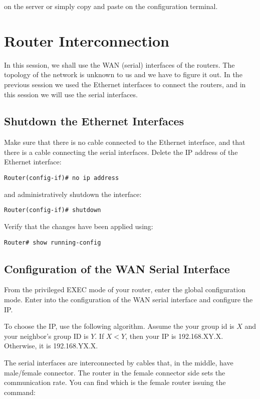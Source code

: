 on the server or simply copy and paste on the configuration terminal.

\section{Router Interconnection}

In this session, we shall use the WAN (serial) interfaces of the routers. The topology of the network is unknown to us and we have to figure it out. In the previous session we used the Ethernet interfaces to connect the routers, and in this session we will use the serial interfaces.

\subsection{Shutdown the Ethernet Interfaces}

Make sure that there is no cable connected to the Ethernet interface, and that there is a cable connecting the serial interfaces. Delete the IP address of the Ethernet interface:

\begin{lstlisting}
Router(config-if)# no ip address
\end{lstlisting}

and administratively shutdown the interface:

\begin{lstlisting}
Router(config-if)# shutdown
\end{lstlisting}

Verify that the changes have been applied using:

\begin{lstlisting}
Router# show running-config
\end{lstlisting}

\subsection{Configuration of the WAN Serial Interface}

From the privileged EXEC mode of your router, enter the global configuration mode. Enter into the configuration of the WAN serial interface and configure the IP.

To choose the IP, use the following algorithm. Assume the your group id is $X$ and your neighbor's group ID is $Y$. If $X<Y$, then your IP is 192.168.XY.X. Otherwise, it is 192.168.YX.X.

The serial interfaces are interconnected by cables that, in the middle, have male/female connector. The router in the female connector side sets the communication rate. You can find which is the female router issuing the command:

